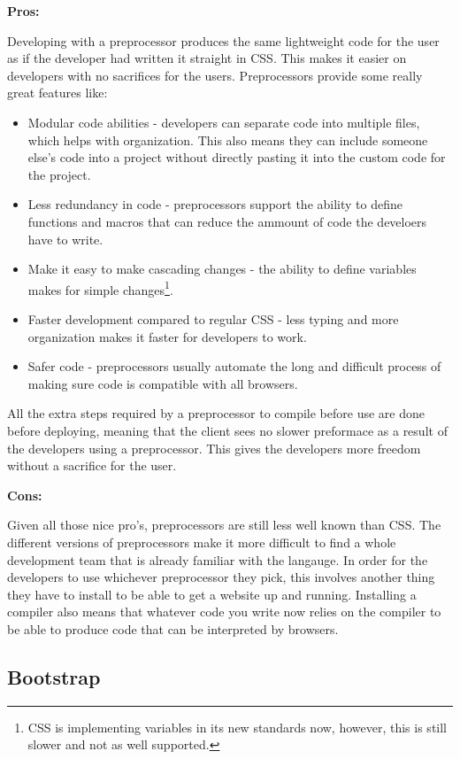 \documentclass[draftclsnofoot,onecolumn,letterpaper,10pt,compsoc]{IEEEtran}
\begin{document}
    \textbf{Pros:}

     Developing with a preprocessor produces the same lightweight code for the user as if the developer had written it straight in CSS. This makes it easier on developers with no sacrifices for the users. Preprocessors provide some really great features like:
     \begin{itemize}
       \item Modular code abilities - developers can separate code into multiple files, which helps with organization. This also means they can include someone else's code into a project without directly pasting it into the custom code for the project.
       \item Less redundancy in code - preprocessors support the ability to define functions and macros that can reduce the ammount of code the develoers have to write.
       \item Make it easy to make cascading changes - the ability to define variables makes for simple changes\footnote{CSS is implementing variables in its new standards now, however, this is still slower and not as well supported.}.
       \item Faster development compared to regular CSS - less typing and more organization makes it faster for developers to work.
       \item Safer code - preprocessors usually automate the long and difficult process of making sure code is compatible with all browsers.
     \end{itemize}

     All the extra steps required by a preprocessor to compile before use are done before deploying, meaning that the client sees no slower preformace as a result of the developers using a preprocessor.
     This gives the developers more freedom without a sacrifice for the user.

    \textbf{Cons:}

    Given all those nice pro's, preprocessors are still less well known than CSS.
    The different versions of preprocessors make it more difficult to find a whole development team that is already familiar with the langauge.
    In order for the developers to use whichever preprocessor they pick, this involves another thing they have to install to be able to get a website up and running.
    Installing a compiler also means that whatever code you write now relies on the compiler to be able to produce code that can be interpreted by browsers.


	\subsection{Bootstrap}
\end{document}
